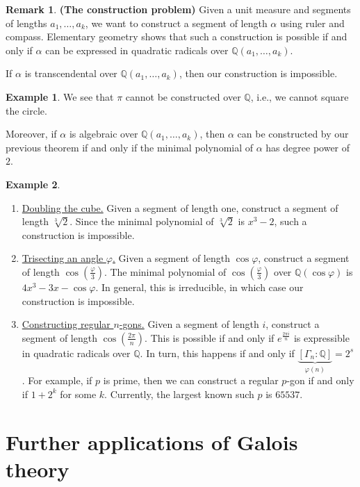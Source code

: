 \documentclass[10pt,letterpaper,cm]{nupset}
\theoremstyle{definition}
\newtheorem{exmp}{Example}
\newtheorem{remark}{Remark}
\newcommand{\Q}{\mathbb Q}
\newcommand{\1}{\mathbf{1}}
\newcommand{\0}{\vec 0}
\begin{document}
\begin{remark}{\textbf{(The construction problem)}}
Given a unit measure and segments of lengths $a_1, \ldots, a_k$, we want to construct a segment of length $\alpha$ using ruler and compass. Elementary geometry shows that such a construction is possible if and only if $\alpha$ can be expressed in quadratic radicals over $\Q(a_1, \ldots, a_k)$. 

If $\alpha$ is transcendental over $\Q(a_1, \ldots, a_k)$, then our construction is impossible. 
\begin{exmp}
We see that $\pi$ cannot be constructed over $\Q$, i.e., we cannot square the circle. 
\end{exmp} 
Moreover, if $\alpha$ is algebraic over $\Q(a_1, \ldots, a_k)$, then $\alpha$ can be constructed by our previous theorem if and only if the minimal polynomial of $\alpha$ has degree power of $2$.
\begin{exmp} $ $
\begin{enumerate}[label=(\alph*)]
\item \underline{Doubling the cube.} Given a segment of length one, construct a segment of length $\sqrt[3]{2}$. Since the minimal polynomial of $\sqrt[3]{2}$ is $x^3-2$, such a construction is impossible.
\item \underline{Trisecting an angle $\varphi$.} Given a segment of length $\cos{\varphi}$, construct a segment of length $\cos(\frac{\varphi}{3})$. The minimal polynomial of $\cos(\frac{\varphi}{3})$ over $\Q(\cos{\varphi})$ is $4x^3 - 3x - \cos{\varphi}$. In general, this is irreducible, in which case our construction is impossible. 
\item \underline{Constructing regular $n$-gons.} Given a segment of length $i$, construct a segment of length $\cos(\frac{2\pi}{n})$. This is possible if and only if $e^{\frac{2\pi i}{n}}$ is expressible in quadratic radicals over $\Q$. In turn, this happens if and only if $\underbrace{[\Gamma_n : \Q]}_{\varphi(n)} = 2^s$. For example, if $p$ is prime, then we can construct a regular $p$-gon if and only if $1+2^k$ for some $k$. Currently, the largest known such $p$ is $\num{65537}$.
\end{enumerate}
\end{exmp}
\end{remark}

\section{Further applications of Galois theory}
\end{document}
